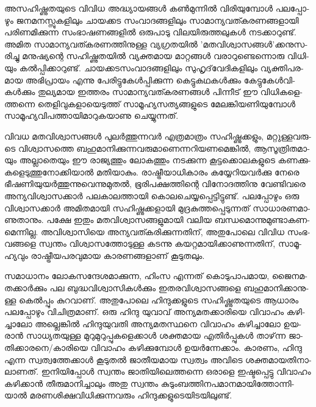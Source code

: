 
\vskip 2pt

അ­സ­ഹി­ഷ്ണു­ത­യു­ടെ വി­വിധ അദ്ധ്യാ­യ­ങ്ങള്‍ കണ്‍­മു­ന്നില്‍ വി­രി­യു­മ്പോള്‍ പല­പ്പോ­ഴും ജന­മ­ന­സ്സു­ക­ളി­ലും ചാ­യ­ക്കട സം­വാ­ദ­ങ്ങ­ളി­ലും 
സാ­മാ­ന്യ­വ­ത്ക­ര­ണ­ങ്ങ­ളാ­യി പരി­ണ­മി­ക്കു­ന്ന സം­ഭാ­ഷ­ണ­ങ്ങ­ളില്‍ ഒരു­പാ­ടു വി­ല­യി­രു­ത്ത­ലു­കള്‍ നട­ക്കാ­റു­ണ്ട്. അമിത സാ­മാ­ന്യ­വ­ത്ക­ര­ണ­ത്തി­നു­ള്ള
 വ്യ­ഗ്ര­ത­യില്‍ 'മ­ത­വി­ശ്വാ­സ­ങ്ങള്‍'­ക്ക­നു­സ­രി­ച്ചു മനു­ഷ്യ­ന്റെ സഹി­ഷ്ണു­ത­യില്‍ വ്യ­ക്ത­മായ മാ­റ്റ­ങ്ങള്‍ വരാ­റു­ണ്ടെ­ന്നൊ­രു വി­ധി­യും കല്‍­പ്പി­ക്കാ­റു­ണ്ട്. 
 ചാ­യ­ക്ക­ട­സം­വാ­ദ­ങ്ങ­ളി­ലും സു­ഹൃ­ദ്‌­വേ­ദി­ക­ളി­ലും വ്യ­ക്തി­പ­ര­മായ അഭി­പ്രാ­യം എന്നു പേ­രി­ട്ടു­കേള്‍­പ്പി­ക്കു­ന്ന കെ­ട്ടു­ക­ഥ­കള്‍­ക്കും കേ­ട്ടു­കേള്‍­വി­കള്‍­ക്കും
  തു­ല്യ­മായ ഇത്ത­രം സാ­മാ­ന്യ­വ­ത്ക­ര­ണ­ങ്ങള്‍ പി­ന്നീ­ട് ഈ വി­ധി­ക­ളെ­ത്ത­ന്നെ തെ­ളി­വു­ക­ളാ­യെ­ടു­ത്ത് സാ­മൂ­ഹ്യ­സ­ത്യ­ങ്ങ­ളു­ടെ 
  മേ­ല­ങ്കി­യ­ണി­യു­മ്പോള്‍ സാ­മൂ­ഹ്യ­വി­പ­ത്താ­യി­മാ­റു­ക­യാ­ണു ചെ­യ്യു­ന്ന­ത്.

­വി­വധ മത­വി­ശ്വാ­സ­ങ്ങള്‍ പു­ലര്‍­ത്തു­ന്ന­വര്‍ എത്ര­മാ­ത്രം സഹി­ഷ്ണു­ക്ക­ളും, മറ്റു­ള്ള­വ­രു­ടെ വി­ശ്വാ­സ­ത്തെ ബഹു­മാ­നി­ക്കു­ന്ന­വ­രു­മാ­ണെ­ന്ന­റി­യ­ണ­മെ­ങ്കില്‍, 
ആസൂ­ത്രി­ത­മാ­യും അല്ലാ­തെ­യും ഈ രാ­ജ്യ­ത്തും ലോ­ക­ത്തും നട­ക്കു­ന്ന കൂ­ട്ട­ക്കൊ­ല­ക­ളു­ടെ കണ­ക്കു­ക­ളെ­ടു­ത്തു­നോ­ക്കി­യാല്‍ മതി­യാ­കും. 
രാ­ഷ്ട്രീ­യാ­ധി­കാ­രം കയ്യേ­റി­യ­വര്‍­ക്കു നേ­രെ ഭീ­ഷ­ണി­യു­യര്‍­ത്തു­ന്നു­വെ­ന്നു­മു­തല്‍, ഭൂ­രി­പ­ക്ഷ­ത്തി­ന്റെ വി­നോ­ദ­ത്തി­നു വേ­ണ്ടി­വ­രെ അന്യ­വി­ശ്വാ­സ­ക്കാര്‍ 
പല­കാ­ല­ത്താ­യി കൊ­ല­ചെ­യ്യ­പ്പെ­ട്ടി­ട്ടു­ണ്ട്. പല­പ്പോ­ഴും ഒരു വി­ശ്വാ­സ­ക്കാര്‍ അമി­ത­മാ­യി സഹി­ഷ്ണു­ക്ക­ളാ­യി മു­ദ്ര­കു­ത്ത­പ്പെ­ടു­ന്ന­ത് സാ­ധാ­ര­ണ­മാ­ണു­താ­നും. 
പക്ഷേ ഇതും മത­വി­ശ്വാ­സ­ങ്ങ­ളു­മാ­യി വലിയ ബന്ധ­മൊ­ന്നു­മു­ണ്ടാ­ക­ണ­മെ­ന്നി­ല്ല. അവി­ശ്വാ­സി­യെ അന്യ­വ­ത്ക­രി­ക്കു­ന്ന­തി­ന്, അതു­പോ­ലെ 
വി­വിധ സം­ഭ­വ­ങ്ങ­ളെ സ്വ­ന്തം വി­ശ്വാ­സ­ത്തോ­ടു­ള്ള കട­ന്നു കയ­റ്റ­മാ­യി­ക്കാ­ണു­ന്ന­തി­ന്, സാ­മൂ­ഹ്യ­വും രാ­ഷ്ട്രീ­യ­പ­ര­വു­മായ കാ­ര­ണ­ങ്ങ­ളാ­ണ് കൂ­ടു­ത­ലും­.

­സ­മാ­ധാ­നം ലോ­ക­സ­ന്ദേ­ശ­മാ­ക്കു­ന്ന, ഹിംസ എന്ന­ത് കൊ­ടു­പാ­പ­മാ­യ, ജൈ­ന­മ­ത­ക്കാര്‍­ക്കും പല ബു­ദ്ധ­വി­ശ്വാ­സി­കള്‍­ക്കും 
ഇത­ര­വി­ശ്വാ­സ­ങ്ങ­ളെ ബഹു­മാ­നി­ക്കാ­നു­ള്ള കെല്‍­പ്പും കു­റ­വാ­ണ്. അതു­പോ­ലെ ഹി­ന്ദു­ക്ക­ളു­ടെ സഹി­ഷ്ണു­ത­യു­ടെ ആധാ­രം പല­പ്പോ­ഴും 
വി­ചി­ത്ര­മാ­ണ്. ഒരു ഹി­ന്ദു യു­വാ­വ് അന്യ­മ­ത­ക്കാ­രി­യെ വി­വാ­ഹം കഴി­ച്ചാ­ലോ അല്ലെ­ങ്കില്‍ ഹി­ന്ദു­യു­വ­തി അന്യ­മ­ത­സ്ഥ­നെ വി­വാ­ഹം 
കഴി­ച്ചാ­ലോ ഉയ­രാന്‍ സാ­ധ്യ­ത­യു­ള്ള മു­റു­മു­റു­പ്പു­ക­ളെ­ക്കാള്‍ ശക്ത­മായ എതിര്‍­പ്പു­കള്‍ താ­ഴ്‌­ന്ന ജാ­തി­ക്കാ­ര­നെ­/­കാ­രി­യെ വി­വാ­ഹം 
കഴി­ക്കു­മ്പോള്‍ ഉയര്‍­ന്നേ­ക്കാം. കാ­ര­ണം, ഹി­ന്ദു എന്ന സ്വ­ത്വ­ത്തേ­ക്കാള്‍ കൂ­ടു­തല്‍ ജാ­തീ­യ­മായ സ്വ­ത്വം അവി­ടെ ശക്ത­മാ­യ­തി­നാ­ലാ­ണ­ത്. 
ഇനി­യി­പ്പോള്‍ സ്വ­ന്തം ജാ­തി­യി­ലെ­ത്ത­ന്നെ ഒരാ­ളെ ഇഷ്ട­പ്പെ­ട്ടു വി­വാ­ഹം കഴി­ക്കാന്‍ തീ­രു­മാ­നി­ച്ചാ­ലും അതു സ്വ­ന്തം 
കു­ടും­ബ­ത്തി­ന­പ­മാ­ന­മാ­യി­ത്തോ­ന്നി­യാല്‍ മര­ണ­ശി­ക്ഷ­വി­ധി­ക്കു­ന്ന­വ­രും ഹി­ന്ദു­ക്ക­ളു­ടെ­യി­ട­യി­ലു­ണ്ട്.


